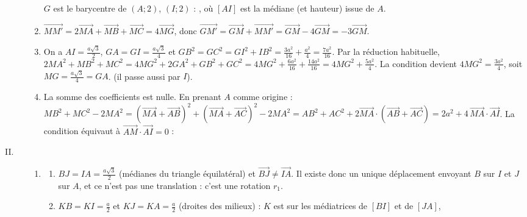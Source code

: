 \begin{corrige}
\begin{sol}
\begin{description}
\begin{enumerate}
                  $G$ est le barycentre de $(A;2)$, $(I;2)$ : , où $[AI]$ est la médiane (et hauteur) issue de $A$.
            \item $\overrightarrow{MM'} = 2\overrightarrow{MA} + \overrightarrow{MB} + \overrightarrow{MC} = 4\overrightarrow{MG}$, donc
                  $\overrightarrow{GM'} = \overrightarrow{GM} + \overrightarrow{MM'} = \overrightarrow{GM} - 4\overrightarrow{GM} = -3\overrightarrow{GM}$.
            \item On a $AI = \frac{a\sqrt3}{2}$, $GA = GI = \frac{a\sqrt3}{4}$ et $GB^2 = GC^2 = GI^2 + IB^2 = \frac{3a^2}{16} + \frac{a^2}{4} = \frac{7a^2}{16}$.
                  Par la réduction habituelle,
                  $2MA^2 + MB^2 + MC^2 = 4MG^2 + 2GA^2 + GB^2 + GC^2 = 4MG^2 + \frac{6a^2}{16} + \frac{14a^2}{16} = 4MG^2 + \frac{5a^2}{4}$.
                  La condition devient $4MG^2 = \frac{3a^2}{4}$, soit $MG = \frac{a\sqrt3}{4} = GA$.
                   (il passe aussi par $I$).
            \item La somme des coefficients est nulle. En prenant $A$ comme origine :
                  $MB^2 + MC^2 - 2MA^2 = (\overrightarrow{MA} + \overrightarrow{AB})^2 + (\overrightarrow{MA} + \overrightarrow{AC})^2 - 2MA^2
                  = AB^2 + AC^2 + 2\overrightarrow{MA}\cdot(\overrightarrow{AB} + \overrightarrow{AC}) = 2a^2 + 4\,\overrightarrow{MA}\cdot\overrightarrow{AI}$.
                  La condition équivaut à $\overrightarrow{AM}\cdot\overrightarrow{AI} = 0$ :
      \end{enumerate}
      \item[II.]
      \begin{enumerate}
            \item \begin{enumerate}
                        \item $BJ = IA = \frac{a\sqrt3}{2}$ (médianes du triangle équilatéral) et $\overrightarrow{BJ} \neq \overrightarrow{IA}$.
                              Il existe donc un unique déplacement envoyant $B$ sur $I$ et $J$ sur $A$, et ce n'est pas une translation :
                              c'est une rotation $r_1$.
                        \item $KB = KI = \frac{a}{2}$ et $KJ = KA = \frac{a}{2}$ (droites des milieux) : $K$ est sur les médiatrices de $[BI]$ et de $[JA]$,

\end{enumerate}
\end{enumerate}
\end{description}
\end{sol}
\end{corrige}
